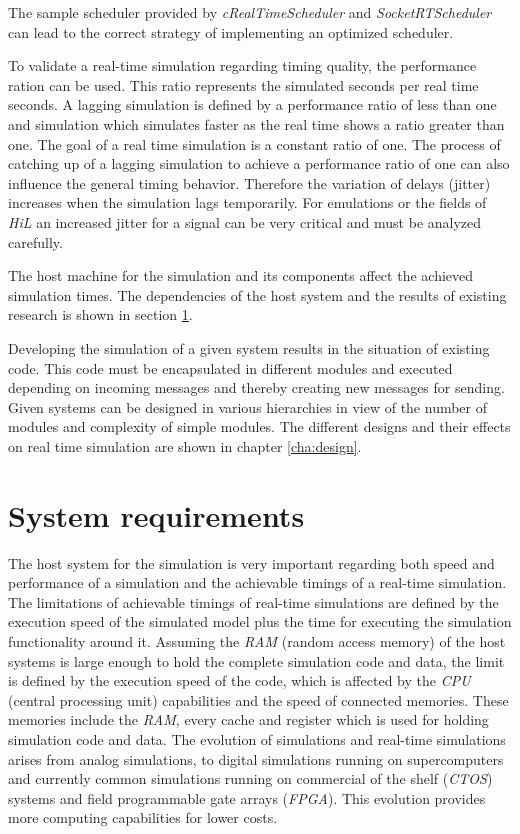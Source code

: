 \begin{sloppypar}
The sample scheduler provided by \emph{cRealTimeScheduler} and \mbox{\emph{SocketRTScheduler}} can lead to the correct strategy of implementing an optimized scheduler.
\end{sloppypar}

To validate a real-time simulation regarding timing quality, the performance ration can be used.
This ratio represents the simulated seconds per real time seconds.
A lagging simulation is defined by a performance ratio of less than one and simulation which simulates faster as the real time shows a ratio greater than one.
The goal of a real time simulation is a constant ratio of one.
The process of catching up of a lagging simulation to achieve a performance ratio of one can also influence the general timing behavior.
Therefore the variation of delays (jitter) increases when the simulation lags temporarily.
For emulations or the fields of \emph{HiL} an increased jitter for a signal can be very critical and must be analyzed carefully.

\begin{sloppypar}
The host machine for the simulation and its components affect the achieved simulation times.
The dependencies of the host system and the results of existing research is shown in section \ref{sec:simulation_requirements}.
\end{sloppypar}

Developing the simulation of a given system results in the situation of existing code.
This code must be encapsulated in different modules and executed depending on incoming messages and thereby creating new messages for sending.
Given systems can be designed in various hierarchies in view of the number of modules and complexity of simple modules.
The different designs and their effects on real time simulation are shown in chapter \ref{cha:design}.

\section{System requirements}
\label{sec:simulation_requirements}
The host system for the simulation is very important regarding both speed and performance of a simulation and the achievable timings of a real-time simulation.
The limitations of achievable timings of real-time simulations are defined by the execution speed of the simulated model plus the time for executing the simulation functionality around it.
Assuming the \emph{RAM} (random access memory) of the host systems is large enough to hold the complete simulation code and data, the limit is defined by the execution speed of the code, which is affected by the \emph{CPU} (central processing unit) capabilities and the speed of connected memories.
These memories include the \emph{RAM}, every cache and register which is used for holding simulation code and data.
The evolution of simulations and real-time simulations arises from analog simulations, to digital simulations running on supercomputers and currently common simulations running on commercial of the shelf (\emph{CTOS}) systems and field programmable gate arrays (\emph{FPGA}).
This evolution provides more computing capabilities for lower costs. \cite[section IV]{belanger_what_2010}